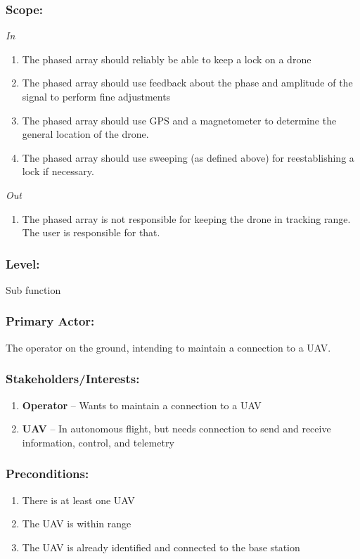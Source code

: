 \documentclass[ProductRequirements.tex]{subfiles}
\begin{document}
	\subsubsection*{Scope:}
	\textit{In}
	\begin{enumerate}
		\item The phased array should reliably be able to keep a lock on a drone
		\item The phased array should use feedback about the phase and amplitude of the signal to perform fine adjustments
		\item The phased array should use GPS and a magnetometer to determine the general location of the drone.
		\item The phased array should use sweeping (as defined above) for reestablishing a lock if necessary.
	\end{enumerate}
	\textit{Out}
	\begin{enumerate}
		\item The phased array is not responsible for keeping the drone in tracking range. The user is responsible for that.
	\end{enumerate}
	\subsubsection*{Level:}
	Sub function
	\subsubsection*{Primary Actor:}
	The operator on the ground, intending to maintain a connection to a UAV.
	\subsubsection*{Stakeholders/Interests:}
	\begin{enumerate}\itemsep1pt
		\item \textbf{Operator} -- Wants to maintain a connection to a UAV
		\item \textbf{UAV} -- In autonomous flight, but needs connection to send and receive information, control, and telemetry
	\end{enumerate}
	\subsubsection*{Preconditions:}
	\begin{enumerate}\itemsep1pt
		\item There is at least one UAV
		\item The UAV is within range
		\item The UAV is already identified and connected to the base station
	\end{enumerate}
\end{document}
